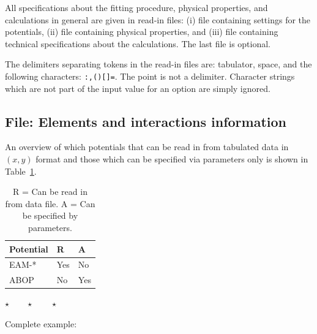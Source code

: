 \documentclass[a4paper,12pt,pdftex,onecolumn]{article}
\newcommand{\stars}{\begin{center}%
\vspace{1em plus 0.5em minus 0.5em}%
$\star \qquad \star \qquad \star$%
\vspace{1em plus 0.5em minus 0.5em}%
\end{center}}
\begin{document}
All specifications about the fitting procedure, physical properties,
and calculations in general are given in read-in files:
(i) file containing settings for the potentials,
(ii) file containing physical properties, and
(iii) file containing technical specifications about the
calculations. The last file is optional.

The delimiters separating tokens in the read-in files are:
tabulator, space, and the following characters: \verb+:,()[]=+. The
point is not a delimiter. Character strings which are not part of the
input value for an option are simply ignored.





\subsection{File: Elements and interactions information}


An overview of which potentials that can be read in from tabulated data
in $(x, y)$ format and those which can be specified via parameters only
is shown in Table~\ref{tab:pot-da}.


\begin{table}[!h]
\caption{
R = Can be read in from data file.
A = Can be specified by parameters.
\label{tab:pot-da}
}
\begin{center}
\begin{tabular}{|l|l|l|}
\hline
\hline
Potential   & R    & A  \\
\hline
EAM-*       & Yes  & No \\
ABOP        & No   & Yes \\
\hline
\hline
\end{tabular}
\end{center}
\end{table}

\stars


Complete example:
\end{document}
